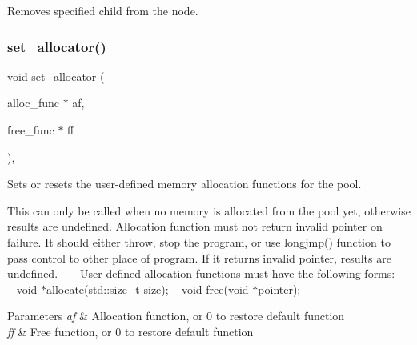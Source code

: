 Removes specified child from the node. 

\mbox{\label{classrapidxml_1_1memory__pool_ac0a55a6ef0837dca67572e357100d78a}} 
\subsubsection{\texorpdfstring{set\+\_\+allocator()}{set\_allocator()}}
{\footnotesize\ttfamily void set\+\_\+allocator (\begin{DoxyParamCaption}\item[{alloc\+\_\+func $\ast$}]{af,  }\item[{free\+\_\+func $\ast$}]{ff }\end{DoxyParamCaption})\hspace{0.3cm}{\ttfamily [inline]}, {\ttfamily [inherited]}}



Sets or resets the user-\/defined memory allocation functions for the pool. 

This can only be called when no memory is allocated from the pool yet, otherwise results are undefined. Allocation function must not return invalid pointer on failure. It should either throw, stop the program, or use {\ttfamily longjmp()} function to pass control to other place of program. If it returns invalid pointer, results are undefined. ~\newline
~\newline
 User defined allocation functions must have the following forms\+: ~\newline
{\ttfamily  ~\newline
void $\ast$allocate(std\+::size\+\_\+t size); ~\newline
void free(void $\ast$pointer); }~\newline
 
\begin{DoxyParams}{Parameters}
{\em af} & Allocation function, or 0 to restore default function \\
\hline
{\em ff} & Free function, or 0 to restore default function \\
\hline
\end{DoxyParams}
\mbox{\label{classrapidxml_1_1xml__node_a026a603e420a2e3e7ab820cfbd1a7e97}} 
